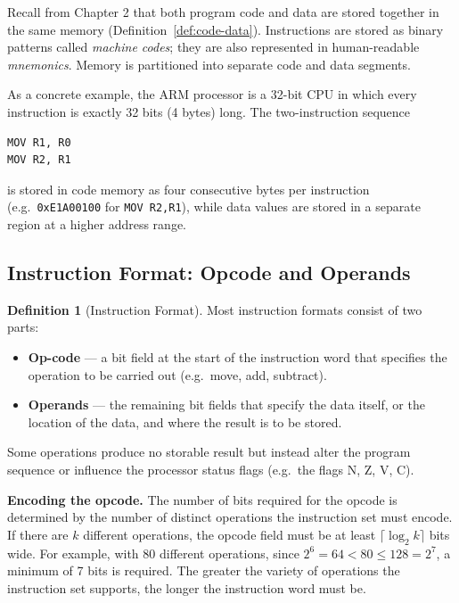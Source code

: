 \documentclass[11pt, a4paper, notitlepage]{report}
\theoremstyle{definition}
\newtheorem{definition}[theorem]{Definition}
\theoremstyle{remark}
\theoremstyle{definition}
\begin{document}
Recall from Chapter 2 that both program code and data are stored together in the same memory (Definition~\ref{def:code-data}). Instructions are stored as binary patterns called \emph{machine codes}; they are also represented in human-readable \emph{mnemonics}. Memory is partitioned into separate code and data segments.

As a concrete example, the ARM processor is a 32-bit CPU in which every instruction is exactly 32 bits (4 bytes) long. The two-instruction sequence
\begin{lstlisting}
MOV R1, R0
MOV R2, R1
\end{lstlisting}
is stored in code memory as four consecutive bytes per instruction (e.g.\ \texttt{0xE1A00100} for \texttt{MOV R2,R1}), while data values are stored in a separate region at a higher address range.

\subsection{Instruction Format: Opcode and Operands}

\begin{definition}[Instruction Format]
\label{def:instruction-format}
Most instruction formats consist of two parts:
\begin{itemize}
  \item \textbf{Op-code} --- a bit field at the start of the instruction word that specifies the operation to be carried out (e.g.\ move, add, subtract).
  \item \textbf{Operands} --- the remaining bit fields that specify the data itself, or the location of the data, and where the result is to be stored.
\end{itemize}
\end{definition}

Some operations produce no storable result but instead alter the program sequence or influence the processor status flags (e.g.\ the flags N, Z, V, C).

\textbf{Encoding the opcode.} The number of bits required for the opcode is determined by the number of distinct operations the instruction set must encode. If there are $k$ different operations, the opcode field must be at least $\lceil \log_2 k \rceil$ bits wide. For example, with 80 different operations, since $2^6 = 64 < 80 \le 128 = 2^7$, a minimum of 7 bits is required. The greater the variety of operations the instruction set supports, the longer the instruction word must be.
\end{document}
